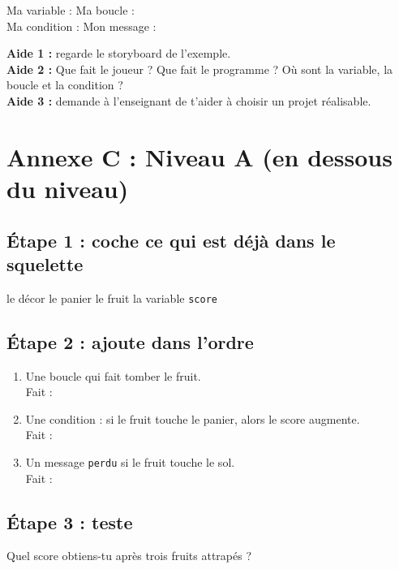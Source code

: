 \documentclass[11pt,a4paper]{article}
\begin{document}
\medskip
Ma variable : \dotfill\quad Ma boucle : \dotfill\\
Ma condition : \dotfill\quad Mon message : \dotfill

\begin{tcolorbox}[colback=yellow!10,colframe=yellow!50!black,title={Cartes d'aide à utiliser dans l'ordre},fonttitle=\bfseries\small]
\textbf{Aide 1 :} regarde le storyboard de l'exemple.\\
\textbf{Aide 2 :} Que fait le joueur ? Que fait le programme ? Où sont la variable, la boucle et la condition ?\\
\textbf{Aide 3 :} demande à l'enseignant de t'aider à choisir un projet réalisable.
\end{tcolorbox}

\newpage
\section*{Annexe C : Niveau A (en dessous du niveau)}

\subsection*{Étape 1 : coche ce qui est déjà dans le squelette}
\cb le décor \quad \cb le panier \quad \cb le fruit \quad \cb la variable \texttt{score}

\subsection*{Étape 2 : ajoute dans l'ordre}
\begin{enumerate}
 \item Une boucle qui fait tomber le fruit.\\ Fait : \cb
 \item Une condition : si le fruit touche le panier, alors le score augmente.\\ Fait : \cb
 \item Un message \texttt{perdu} si le fruit touche le sol.\\ Fait : \cb
\end{enumerate}

\subsection*{Étape 3 : teste}
Quel score obtiens-tu après trois fruits attrapés ? \dotfill
\end{document}
